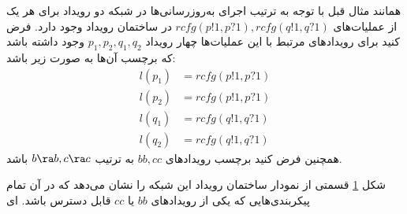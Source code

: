 همانند مثال قبل با توجه به ترتیب اجرای به‌روز‌رسانی‌ها در شبکه دو رویداد برای هر یک از عملیات‌های
$rcfg(p!1,p?1),rcfg(q!1,q?1)$
در ساختمان رویداد وجود دارد.
فرض کنید برای رویداد‌های مرتبط با این عملیات‌ها چهار رویداد
$p_1,p_2,q_1,q_2$
وجود داشته باشد که برچسب آن‌ها به صورت زیر باشد:
\begin{align*}
    l(p_1)  & = rcfg(p!1,p?1) \\
    l(p_2)  & = rcfg(p!1,p?1) \\
    l(q_1)  & = rcfg(q!1,q?1) \\
    l(q_2)  & = rcfg(q!1,q?1) 
\end{align*}
همچنین فرض کنید برچسب رویداد‌های 
$bb,cc$
به ترتیب 
$b\ra b,c\ra c$
باشد.
\begin{figure}
    \caption{}
    \label{fig:loop:es}
\end{figure}

شکل
\ref{fig:loop:es}
قسمتی از نمودار ساختمان رویداد این شبکه را نشان می‌دهد که در آن تمام پیکر‌بندی‌هایی که یکی از رویداد‌های
$bb$
یا
$cc$
قابل دسترس باشد.
ای